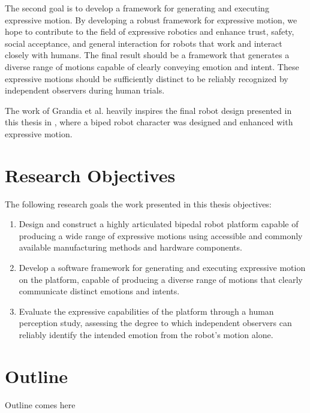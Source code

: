 The second goal is to develop a framework for generating and executing expressive motion. By developing a robust framework for expressive motion, we hope to contribute to the field of expressive robotics and enhance trust, safety, social acceptance, and general interaction for robots that work and interact closely with humans. The final result should be a framework that generates a diverse range of motions capable of clearly conveying emotion and intent. These expressive motions should be sufficiently distinct to be reliably recognized by independent observers during human trials.

The work of Grandia et al. heavily inspires the final robot design presented in this thesis in \cite{Disney}, where a biped robot character was designed and enhanced with expressive motion.

\section{Research Objectives}
The following research goals the work presented in this thesis 
objectives:

\begin{enumerate}
    \item Design and construct a highly articulated bipedal robot platform capable of producing a wide range of expressive motions using accessible and commonly available manufacturing methods and hardware components.

    \item Develop a software framework for generating and executing expressive motion on the platform, capable of producing a diverse range of motions that clearly communicate distinct emotions and intents.

    \item Evaluate the expressive capabilities of the platform through a human perception study, assessing the degree to which independent observers can reliably identify the intended emotion from the robot's motion alone.
\end{enumerate}

\section{Outline}
Outline comes here
